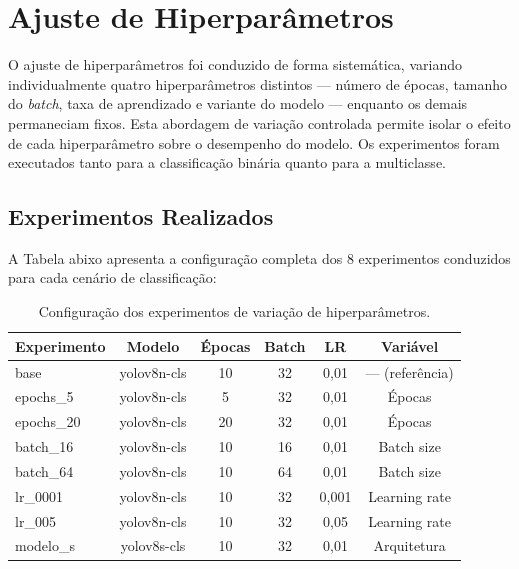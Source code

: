 \documentclass[12pt, a4paper]{article}
\begin{document}
\section{Ajuste de Hiperparâmetros}

O ajuste de hiperparâmetros foi conduzido de forma sistemática, variando individualmente quatro hiperparâmetros distintos --- número de épocas, tamanho do \textit{batch}, taxa de aprendizado e variante do modelo --- enquanto os demais permaneciam fixos. Esta abordagem de variação controlada permite isolar o efeito de cada hiperparâmetro sobre o desempenho do modelo. Os experimentos foram executados tanto para a classificação binária quanto para a multiclasse.

\subsection{Experimentos Realizados}

A Tabela abixo apresenta a configuração completa dos 8 experimentos conduzidos para cada cenário de classificação:

\begin{table}[H]
\centering
\caption{Configuração dos experimentos de variação de hiperparâmetros.}
\label{tab:experimentos}
\begin{tabular}{lccccc}
\toprule
\textbf{Experimento} & \textbf{Modelo} & \textbf{Épocas} & \textbf{Batch} & \textbf{LR} & \textbf{Variável} \\
\midrule
base       & yolov8n-cls & 10 & 32 & 0,01  & --- (referência) \\
epochs\_5  & yolov8n-cls & 5  & 32 & 0,01  & Épocas \\
epochs\_20 & yolov8n-cls & 20 & 32 & 0,01  & Épocas \\
batch\_16  & yolov8n-cls & 10 & 16 & 0,01  & Batch size \\
batch\_64  & yolov8n-cls & 10 & 64 & 0,01  & Batch size \\
lr\_0001   & yolov8n-cls & 10 & 32 & 0,001 & Learning rate \\
lr\_005    & yolov8n-cls & 10 & 32 & 0,05  & Learning rate \\
modelo\_s  & yolov8s-cls & 10 & 32 & 0,01  & Arquitetura \\
\bottomrule
\end{tabular}
\end{table}
\end{document}
